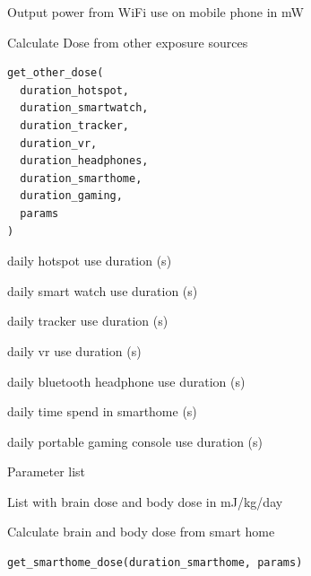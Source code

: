 \documentclass[a4paper]{book}
\begin{document}
%
\begin{Value}
Output power from WiFi use on mobile phone in mW
\end{Value}
%
\begin{Description}
Calculate Dose from other exposure sources
\end{Description}
%
\begin{Usage}
\begin{verbatim}
get_other_dose(
  duration_hotspot,
  duration_smartwatch,
  duration_tracker,
  duration_vr,
  duration_headphones,
  duration_smarthome,
  duration_gaming,
  params
)
\end{verbatim}
\end{Usage}
%
\begin{Arguments}
\begin{ldescription}
\item[\code{duration\_hotspot}] daily hotspot use duration (s)

\item[\code{duration\_smartwatch}] daily smart watch use duration (s)

\item[\code{duration\_tracker}] daily tracker use duration (s)

\item[\code{duration\_vr}] daily vr use duration (s)

\item[\code{duration\_headphones}] daily bluetooth headphone use duration (s)

\item[\code{duration\_smarthome}] daily time spend in smarthome (s)

\item[\code{duration\_gaming}] daily portable gaming console use duration (s)

\item[\code{params}] Parameter list
\end{ldescription}
\end{Arguments}
%
\begin{Value}
List with brain dose and body dose in mJ/kg/day
\end{Value}
%
\begin{Description}
Calculate brain and body dose from smart home
\end{Description}
%
\begin{Usage}
\begin{verbatim}
get_smarthome_dose(duration_smarthome, params)
\end{verbatim}
\end{Usage}
\end{document}
